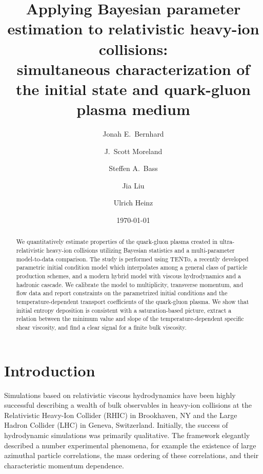 \documentclass[aps,prc,reprint,amsmath,nofootinbib]{revtex4-1}
\newcommand{\trento}{T\raisebox{-0.5ex}{R}ENTo}
\begin{document}
\title{
  Applying Bayesian parameter estimation to relativistic heavy-ion collisions: \\
  simultaneous characterization of the initial state and quark-gluon plasma medium
}

\author{Jonah E.\ Bernhard}
\author{J.\ Scott Moreland}
\author{Steffen A.\ Bass}

\author{Jia Liu}
\author{Ulrich Heinz}

\date{\today}

\begin{abstract}
  We quantitatively estimate properties of the quark-gluon plasma created in ultra-relativistic heavy-ion collisions utilizing Bayesian statistics and a multi-parameter model-to-data comparison.
  The study is performed using \trento, a recently developed parametric initial condition model which interpolates among a general class of particle production schemes, and a modern hybrid model with viscous hydrodynamics and a hadronic cascade.
  We calibrate the model to multiplicity, transverse momentum, and flow data and report constraints on the parametrized initial conditions and the temperature-dependent transport coefficients of the quark-gluon plasma.
  We show that initial entropy deposition is consistent with a saturation-based picture, extract a relation between the minimum value and slope of the temperature-dependent specific shear viscosity, and find a clear signal for a finite bulk viscosity.
\end{abstract}

\maketitle


\section{Introduction}

Simulations based on relativistic viscous hydrodynamics have been highly successful describing a wealth of bulk observables in heavy-ion collisions at the Relativistic Heavy-Ion Collider (RHIC) in Brookhaven, NY and the Large Hadron Collider (LHC) in Geneva, Switzerland.
Initially, the success of hydrodynamic simulations was primarily qualitative.
The framework elegantly described a number experimental phenomena, for example the existence of large azimuthal particle correlations, the mass ordering of these correlations, and their characteristic momentum dependence.
\end{document}
